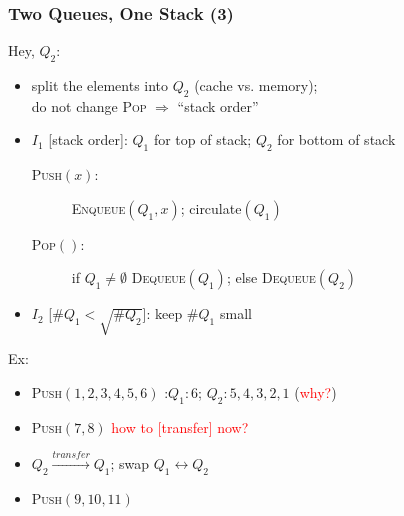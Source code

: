 \documentclass{beamer}
\begin{document}
\begin{frame}
  \frametitle{Two Queues, One Stack (3)}
  
  Hey, $Q_2$:
  \begin{itemize}
    \item split the elements into $Q_2$ (cache vs. memory); \\
    do not change \textsc{Pop} $\Rightarrow$ ``stack order''
    \item $I_1$ [stack order]: $Q_1$ for top of stack; $Q_2$ for bottom of stack
        \begin{description}
          \item [\textsc{Push$(x)$}:] \textsc{Enqueue$(Q_1,x)$};
          circulate$(Q_1)$
          \item [\textsc{Pop$()$}:] if $Q_1 \neq \emptyset$
          \textsc{Dequeue$(Q_1)$}; else \textsc{Dequeue$(Q_2)$} 
        \end{description}    
    \item $I_2$ [$\#Q_1 < \sqrt{\#Q_2}$]: keep $\#Q_1$ small
  \end{itemize}
  
  \vspace{0.50cm}
  Ex: 
  \begin{itemize}
    \item \textsc{Push$(1,2,3,4,5,6)$} :$Q_1: 6$; $Q_2: 5,4,3,2,1$
    (\textcolor{red}{why?})
    \item \textsc{Push$(7,8)$} \textcolor{red}{how to [transfer] now?}
    \item $Q_2 \xrightarrow{transfer} Q_1$; swap $Q_1 \leftrightarrow Q_2$
    \item \textsc{Push$(9,10,11)$}
  \end{itemize}
\end{frame}
\end{document}
